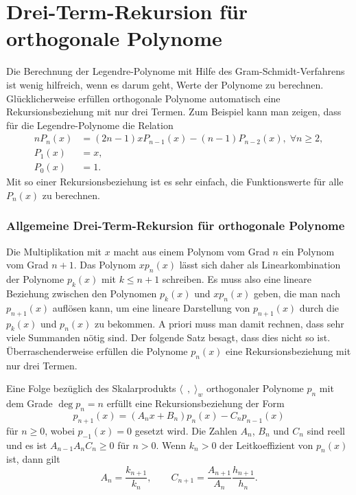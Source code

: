 %
%
%
\section{Drei-Term-Rekursion für orthogonale Polynome
\label{buch:orthogonal:section:drei-term-rekursion}}
Die Berechnung der Legendre-Polynome mit Hilfe des Gram-Schmidt-Verfahrens
ist wenig hilfreich, wenn es darum geht, Werte der Polynome zu berechnen.
Glücklicherweise erfüllen orthogonale Polynome automatisch eine 
Rekursionsbeziehung mit nur drei Termen.
Zum Beispiel kann man zeigen, dass für die Legendre-Polynome die
Relation
\begin{align*}
nP_n(x) &= (2n-1)xP_{n-1}(x) - (n-1)P_{n-2}(x),\;\forall n\ge 2,
\\
P_1(x) &= x,
\\
P_0(x) &= 1.
\end{align*}
Mit so einer Rekursionsbeziehung ist es sehr einfach, die Funktionswerte
für alle $P_n(x)$ zu berechnen.

%
%
\subsubsection{Allgemeine Drei-Term-Rekursion für orthogonale Polynome}
Die Multiplikation mit $x$ macht aus einem Polynom vom Grad $n$ ein
Polynom vom Grad $n+1$.
Das Polynom $xp_n(x)$ lässt sich daher als Linearkombination der
Polynome $p_k(x)$ mit $k\le n+1$ schreiben.
Es muss also eine lineare Beziehung zwischen den Polynomen $p_k(x)$ und
$xp_n(x)$ geben, die man nach $p_{n+1}(x)$ auflösen kann, um eine lineare
Darstellung von $p_{n+1}(x)$ durch die $p_k(x)$ und $p_n(x)$ zu
bekommen.
A priori muss man damit rechnen, dass sehr viele Summanden nötig sind.
Der folgende Satz besagt, dass dies nicht so ist.
Überraschenderweise erfüllen die Polynome $p_n(x)$ eine Rekursionsbeziehung
mit nur drei Termen.

\begin{satz}
%
\label{buch:orthogonal:satz:drei-term-rekursion}
Eine Folge bezüglich des Skalarprodukts $\langle\,\;,\;\rangle_w$
orthogonaler Polynome $p_n$ 
mit dem Grade $\deg p_n = n$ erfüllt eine Rekursionsbeziehung der Form
\begin{equation}
p_{n+1}(x)
=
(A_nx+B_n)p_n(x) - C_np_{n-1}(x)
\label{buch:orthogonal:eqn:rekursion}
\end{equation}
für $n\ge 0$, wobei $p_{-1}(x)=0$ gesetzt wird.
Die Zahlen $A_n$, $B_n$ und $C_n$ sind reell und es ist
$A_{n-1}A_nC_n\ge 0$ für $n>0$. 
Wenn $k_n>0$ der Leitkoeffizient von $p_n(x)$ ist, dann gilt
\begin{equation}
A_n=\frac{k_{n+1}}{k_n},
\qquad
C_{n+1} = \frac{A_{n+1}}{A_n}\frac{h_{n+1}}{h_n}.
\label{buch:orthogonal:eqn:koeffizientenrelation}
\end{equation}
\end{satz}


